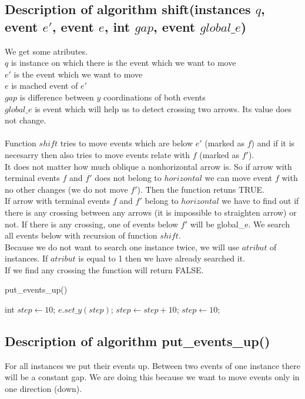 \documentclass{article}
\begin{document}
\subsection*{Description of algorithm shift(instances $q$, event $e'$, event $e$, int $gap$, event $global\_e$)}
We get some atributes.\\
$q$ is instance on which there is the event which we want to move \\
$e'$ is the event which we want to move \\
$e$ is mached event of $e'$ \\
$gap$ is difference between $y$ coordinations of both events \\
$global\_e$ is event which will help us to detect crossing two arrows. Its value does not change. \\
\\
Function $shift$ tries to move events which are below $e'$ (marked as $f$) and if it is necesarry then also tries to move events relate with $f$ (marked as $f'$).\\
It does not matter how much oblique a nonhorizontal arrow is. So if arrow with terminal events $f$ and $f'$ does not belong to $horizontal$ we can move event $f$ with no other changes (we do not move $f'$). Then the function retuns TRUE.\\
If arrow with terminal events $f$ and $f'$ belong to $horizontal$ we have to find out if there is any crossing between any arrows (it is impossible to straighten arrow) or not. If there is any crossing, one of events below $f'$ will be global\_e. We search all events below with recursion of function $shift$.  \\
Because we do not want to search one instance twice, we will use $atribut$ of instances. If $atribut$ is equal to 1 then we have already searched it.\\
If we find any crossing the function will return FALSE. 


\begin{algorithm}
\caption{put\_events\_up()}
\begin{algorithmic}[1]

\STATE int $step \leftarrow 10$;
\STATE {}
\STATE $e.set\_y(step)$;
\STATE $step \leftarrow step + 10$;
\ENDFOR
\STATE $step \leftarrow 10$;
\ENDFOR



\end{algorithmic}
\end{algorithm}

\subsection*{Description of algorithm put\_events\_up()}
For all instances we put their events up. Between two events of one instance there will be a constant gap. We are doing this because we want to move events only in one direction (down).
\end{document}
